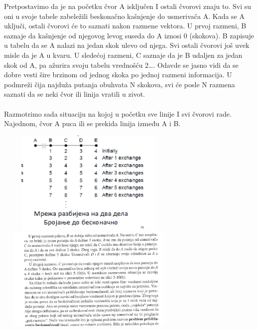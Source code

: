 \documentclass{article} %
\begin{document}
 Pretpostavimo da  je na početku čvor A isključen I ostali čvorovi znaju to. Svi su oni u svoje tabele zabeležili beskonačno kašnjenje  do usmerivača A. Kada se A uključi, ostali čvorovi će to saznati nakon razmene vektora. U prvoj razmeni, B saznaje da kašnjenje od njegovog levog suseda do A iznosi 0 (skokova). B zapisuje u tabelu da se A nalazi na jedan skok ulevo od njega. Svi ostali čvorovi još uvek misle da je A u kvaru.  U sledećoj razmeni, C saznaje da je B udaljen za jedan skok od A, pa ažurira svoju tabelu vrednošću 2…. Odavde se jasno vidi da se dobre vesti šire brzinom od jednog skoka po jednoj razmeni informacija. U podmreži čija najduža putanja obuhvata N skokova, svi će posle N razmena saznati da se neki čvor ili linija vratili u zivot.\\
\\
Razmotrimo sada situaciju na kojoj u početku sve linije I svi čvorovi rade. Najednom, čvor A puca ili se prekida linija između A i B. 
\begin{center}
		\includegraphics[width=9cm, height=5cm]{losa}\\
		\vskip 20mm 
		\includegraphics[width=9cm, height=5cm]{losa2}\\
\end{center}

\newpage
\end{document}
